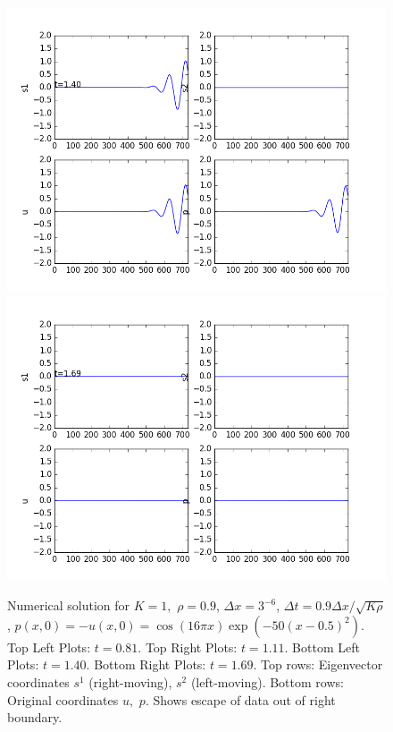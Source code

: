 \documentclass[12pt]{article}
\begin{document}
\begin{enumerate}[(a)]
\begin{figure}[H]
\centering\includegraphics[scale=0.4]{acoustic_wavepacket_frames/acoustic_eqn_fig25.png}
\centering\includegraphics[scale=0.4]{acoustic_wavepacket_frames/acoustic_eqn_fig30.png}
\caption{Numerical solution for $K=1,$ $\rho=0.9$, $\Delta x = 3^{-6}$, $\Delta t = 0.9 \Delta x / \sqrt{K \rho}$, $p(x,0) = -u(x,0)= \cos(16\pi x)\exp(-50(x-0.5)^2)$.  Top Left Plots: $t=0.81$. Top Right Plots: $t=1.11$. Bottom Left Plots: $t=1.40$. Bottom Right Plots: $t=1.69$.  Top rows: Eigenvector coordinates $s^1$ (right-moving), $s^2$ (left-moving).  Bottom rows: Original coordinates $u,$ $p$. Shows escape of data out of right boundary. }
\end{figure}



\end{enumerate}
\end{document}
